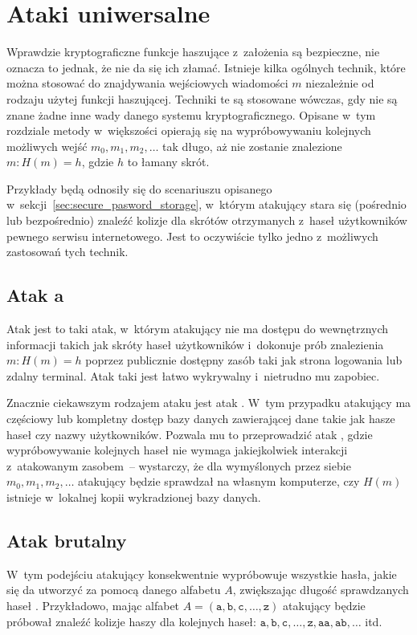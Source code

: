 \section{Ataki uniwersalne}
\label{sec:universal_attacks}
Wprawdzie kryptograficzne funkcje haszujące z~założenia są bezpieczne, nie
oznacza to jednak, że nie da się ich złamać. Istnieje kilka ogólnych technik,
które można stosować do znajdywania wejściowych wiadomości $m$ niezależnie od
rodzaju użytej funkcji haszującej. Techniki te są stosowane wówczas, gdy nie są
znane żadne inne wady danego systemu kryptograficznego. Opisane w~tym rozdziale
metody w~większości opierają się na wypróbowywaniu kolejnych możliwych wejść
$m_0, m_1, m_2, \ldots$ tak długo, aż nie zostanie znalezione $m : H(m) = h$,
gdzie $h$ to łamany skrót.

Przykłady będą odnosiły się do scenariuszu opisanego
w~sekcji~\ref{sec:secure_pasword_storage}, w~którym atakujący stara się
(pośrednio lub bezpośrednio) znaleźć kolizje dla skrótów otrzymanych z~haseł
użytkowników pewnego serwisu internetowego. Jest to oczywiście tylko jedno
z~możliwych zastosowań tych technik.



\subsection{Atak  a~}
Atak  jest to taki atak, w~którym atakujący nie ma dostępu do
wewnętrznych informacji takich jak skróty haseł użytkowników i~dokonuje prób
znalezienia \mbox{$m : H(m) = h$} poprzez publicznie dostępny zasób taki jak
strona logowania lub zdalny terminal. Atak taki jest łatwo wykrywalny
i~nietrudno mu zapobiec.

Znacznie ciekawszym rodzajem ataku jest atak . W~tym przypadku
atakujący ma częściowy lub kompletny dostęp bazy danych zawierającej dane takie
jak hasze haseł czy nazwy użytkowników. Pozwala mu to przeprowadzić atak
, gdzie wypróbowywanie kolejnych haseł nie wymaga jakiejkolwiek
interakcji z~atakowanym zasobem~-- wystarczy, że dla wymyślonych przez siebie
$m_0, m_1, m_2, \ldots$ atakujący będzie sprawdzał na własnym komputerze, czy
$H(m)$ istnieje w~lokalnej kopii wykradzionej bazy danych.



\subsection{Atak brutalny}
W~tym podejściu atakujący konsekwentnie wypróbowuje wszystkie hasła, jakie się
da utworzyć za pomocą danego alfabetu $A$, zwiększając długość sprawdzanych
haseł . Przykładowo, mając alfabet $A=(\mathtt{a},
\mathtt{b}, \mathtt{c}, \ldots, \mathtt{z})$ atakujący będzie próbował znaleźć
kolizje haszy dla kolejnych haseł: $\mathtt{a}, \mathtt{b}, \mathtt{c}, \ldots,
\mathtt{z}, \mathtt{aa}, \mathtt{ab}, \ldots$ itd.

